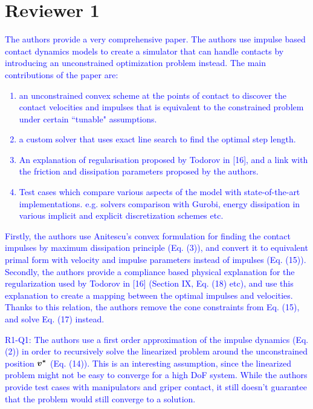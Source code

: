 \section{Reviewer 1}
\label{sec:reviewer_1}
\textcolor{blue}{
The authors provide a very comprehensive paper. The authors use impulse based
contact dynamics models to create a simulator that can handle contacts by
introducing an unconstrained optimization problem instead. The main
contributions of the paper are:
\begin{enumerate}
    \item an unconstrained convex scheme at the points of contact to discover
    the contact velocities and impulses that is equivalent to the constrained
    problem under certain ``tunable" assumptions.
    \item a custom solver that uses exact line search to find the optimal
    step length.
    \item An explanation of regularisation proposed by Todorov in [16], and
    a link with the friction and dissipation parameters proposed by the authors.
    \item Test cases which compare various aspects of the model with
    state-of-the-art implementations. e.g. solvers comparison with Gurobi,
    energy dissipation in various implicit and explicit discretization schemes
    etc.
\end{enumerate}
Firstly, the authors use Anitescu's convex formulation for finding the contact
impulses by maximum dissipation principle (Eq. (3)), and convert it to equivalent
primal form with velocity and impulse parameters instead of impulses (Eq. (15)).
Secondly, the authors provide a compliance based physical explanation for the
regularization used by Todorov in [16] (Section IX, Eq. (18) etc), and use this
explanation to create a mapping between the optimal impulses and velocities.
Thanks to this relation, the authors remove the cone constraints from Eq. (15),
and solve Eq. (17) instead.
}
\vspace{5mm}

\textcolor{blue}{
R1-Q1: The authors use a first order approximation of the impulse dynamics (Eq. (2))
in order to recursively solve the linearized problem around the unconstrained
position ${\bm{v^*}}$ (Eq. (14)). This is an interesting assumption, since the linearized
problem might not be easy to converge for a high DoF system. While the authors
provide test cases with manipulators and griper contact, it still doesn't
guarantee that the problem would still converge to a solution.}

